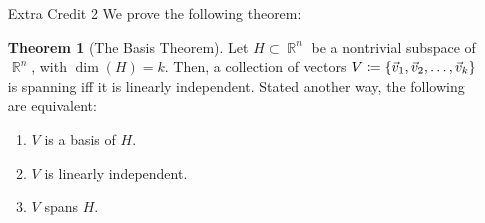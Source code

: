 \documentclass{amsart}
\theoremstyle{definition}
\newtheorem{theorem}[definition]{Theorem}
\theoremstyle{definition}
\DeclareMathOperator{\R}{\mathbb{R}}
\DeclareMathOperator{\1}{\mathbbm{1}}
\begin{document}
\begin{enumerate}[itemsep = 2mm]
\begin{proof}
\begin{enumerate}
				
				\item By the distributive property of matrix multiplication, we have
				\begin{align*}
				E_{i + k(j)} A = \begin{bmatrix} E_1 A  \\ \vdots \\ E_{i-1} A \\ (E_{i} + k E_{j})A \\ E_{i+1} A \\ \vdots \\ E_{j-1} A \\ E_j A \\ E_{j+1} A \\ \vdots \\ E_m A \end{bmatrix}
				= \begin{bmatrix} E_1 A  \\ \vdots \\ E_{i-1} A \\ E_{i}A + k E_{j}A \\ E_{i+1} A \\ \vdots \\ E_{j-1} A \\ E_j A \\ E_{j+1} A \\ \vdots \\ E_m A \end{bmatrix}
				\end{align*}
				from previous parts, we know $E_{i}A$ corresponds to row $i$ of matrix $A$, and $k E_{j}A$ to $k$ multiples of row $j$ of matrix $A$.
			\end{enumerate}
			Combining the three parts above concludes the proof.
		\end{proof}
		
		
		\item[Extra Credit 2] We prove the following theorem:
		
		\begin{theorem}[The Basis Theorem]
			\label{thmbasis}
			Let $H \subset \R^n$ be a nontrivial subspace of $\R^n$, with $\dim (H) = k$. Then, a collection of vectors $V \coloneqq \set{\vec{v}_1, \vec{v}_2, \dots, \vec{v}_k}$ is spanning iff it is linearly independent. Stated another way, the following are equivalent:
			\begin{enumerate}
				\item $V$ is a basis of $H$.
				\item $V$ is linearly independent.
				\item $V$ spans $H$.
			\end{enumerate}
		\end{theorem}
	

\end{enumerate}
\end{document}
